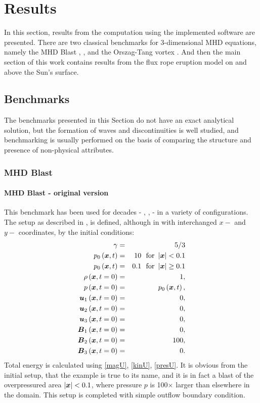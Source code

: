 \chapter{Results}
In this section, results from the computation using the implemented software are presented. There are two classical benchmarks for 3-dimensional MHD equations, namely the MHD Blast \cite{blast1}, \cite{blast2}, and the Orszag-Tang vortex \cite{vortex}. And then the main section of this work contains results from the flux rope eruption model on and above the Sun's surface.

\section{Benchmarks}
The benchmarks presented in this Section do not have an exact analytical solution, but the formation of waves and discontinuities is well studied, and benchmarking is usually performed on the basis of comparing the structure and presence of non-physical attributes.
\subsection{MHD Blast}
\subsubsection{MHD Blast - original version}
This benchmark has been used for decades - \cite{blast0}, \cite{blast1}, \cite{blast2} - in a variety of configurations. The setup as described in \cite{blast0}, \cite{blast1} is defined, although in \cite{blast1} with interchanged $x-$ and $y-$ coordinates, by the initial conditions:
\begin{eqnarray}
\label{mhdBlastOld}
\gamma & = & 5 / 3\\ \nonumber
p_0\left(\mbox{\boldmath $x$}, t\right) & = & 10\ \ \text{for}\ \left|\mbox{\boldmath $x$}\right| < 0.1\\ \nonumber
p_0\left(\mbox{\boldmath $x$}, t\right) & = & 0.1\ \ \text{for}\ \left|\mbox{\boldmath $x$}\right| \geq 0.1\\ \nonumber
\rho\left(\mbox{\boldmath $x$}, t = 0\right) & = & 1,\\ \nonumber
p\left(\mbox{\boldmath $x$}, t = 0\right) & = & p_0\left(\mbox{\boldmath $x$}, t\right),\\ \nonumber
\mbox{\boldmath $u$}_1\left(\mbox{\boldmath $x$}, t = 0\right) & = & 0,\\ \nonumber
\mbox{\boldmath $u$}_2\left(\mbox{\boldmath $x$}, t = 0\right) & = & 0,\\ \nonumber
\mbox{\boldmath $u$}_3\left(\mbox{\boldmath $x$}, t = 0\right) & = & 0,\\ \nonumber
\mbox{\boldmath $B$}_1\left(\mbox{\boldmath $x$}, t = 0\right) & = & 0,\\ \nonumber
\mbox{\boldmath $B$}_2\left(\mbox{\boldmath $x$}, t = 0\right) & = & 100,\\ \nonumber
\mbox{\boldmath $B$}_3\left(\mbox{\boldmath $x$}, t = 0\right) & = & 0.
\end{eqnarray}
Total energy is calculated using \ref{magU}, \ref{kinU}, \ref{presU}.
It is obvious from the initial setup, that the example is true to its name, and it is in fact a blast of the overpressured area $\left|\mbox{\boldmath $x$}\right| < 0.1$, where pressure $p$ is 100$\times$ larger than elsewhere in the domain. This setup is completed with simple outflow boundary condition.


